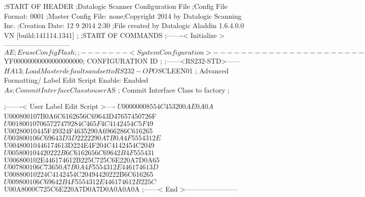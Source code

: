 ;START OF HEADER
;Datalogic Scanner Configuration File
;Config File Format: 0001
;Master Config File: none;Copyright 2014 by Datalogic Scanning Inc.
;Creation Date: 12 9 2014 2:30
;File created by Datalogic Aladdin 1.6.4.0.0 VN [build:141114.1341]
;
;START OF COMMANDS
;-------< Initialize >-----------------------------
$AE                 ; Erase Config Flash
;
;-------< System Configuration >-------------------------------
$YF00000000000000000000; CONFIGURATION ID
;
;------<RS232-STD>------
$HA13               ; Load Master defaults and set to RS232-OPOS
$CLEEN01            ; Advanced Formatting/ Label Edit Script Enable: Enabled
$As                 ; Commit Interface Class to user
$AS                 ; Commit Interface Class to factory
;

;-------< User Label Edit Script >----
$U00000008554C453200AE0A0A
$U000800107B0A6C6162656C69643D47657450726F
$U001800107065727479284C465F4C4142454C5F49
$U00280010445F49324F4635290A6966286C616265
$U003800106C69643D3D2222290A7B0A4F5554312E
$U00480010446174613D224E4F204C4142454C2049
$U005800104420222B6C6162656C69642B4F555431
$U006800102E446174612B225C725C6E220A7D0A65
$U007800106C73650A7B0A4F5554312E446174613D
$U00880010224C4142454C20494420222B6C616265
$U009800106C69642B4F5554312E446174612B225C
$U00A8000C725C6E220A7D0A7D0A0A0A0A
;------< End >-----------------------
